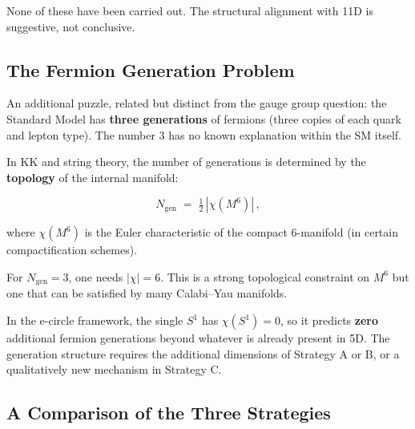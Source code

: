 \documentclass[aps,prd,preprint,superscriptaddress,longbibliography,floatfix]{revtex4-2}
\theoremstyle{remark}
\begin{document}
None of these have been carried out. The structural alignment with 11D is suggestive, not conclusive.



\subsection{The Fermion Generation Problem}

An additional puzzle, related but distinct from the gauge group question: the Standard Model has \textbf{three generations} of fermions (three copies of each quark and lepton type). The number 3 has no known explanation within the SM itself.

In KK and string theory, the number of generations is determined by the \textbf{topology} of the internal manifold:


\begin{equation}
    N_{\text{gen}} \;=\; \tfrac{1}{2}\, |\chi(M^6)| \,,
\end{equation}

where $\chi(M^6)$ is the Euler characteristic of the compact 6-manifold (in certain compactification schemes).

For $N_{\text{gen}} = 3$, one needs $|\chi| = 6$. This is a strong topological constraint on $M^6$ but one that can be satisfied by many Calabi--Yau manifolds.

In the e-circle framework, the single $S^1$ has $\chi(S^1) = 0$, so it predicts \textbf{zero} additional fermion generations beyond whatever is already present in 5D. The generation structure requires the additional dimensions of Strategy A or B, or a qualitatively new mechanism in Strategy C.



\subsection{A Comparison of the Three Strategies}
\end{document}
